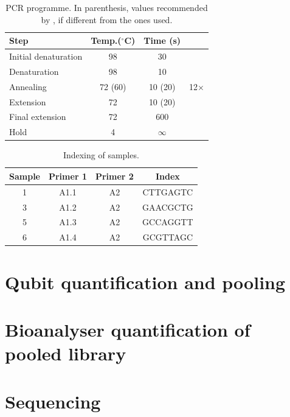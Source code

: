 \documentclass[a4paper,12pt]{article}
\begin{document}
\begin{table}
 \begin{center}
  \caption{PCR programme. In parenthesis, values recommended by \citet{Meyer2010}, if different from the ones used.}\label{tau:pcrprogramme}
  \vspace*{0.3cm}
  \begin{tabular}{lccl}
   \toprule
Step&Temp.($^\circ$C)&Time (s)&\\
   \midrule
Initial denaturation&98&30&\\
Denaturation&98&\multicolumn{1}{c|}{10}&\\
Annealing&72 (60)&\multicolumn{1}{c|}{10 (20)}&12$\times$\\
Extension&72&\multicolumn{1}{c|}{10 (20)}&\\
Final extension&72&600&\\
Hold&4&$\infty$&\\
   \bottomrule
  \end{tabular}
 \end{center}
\end{table}

\begin{table}
 \begin{center}
  \caption{Indexing of samples.}\label{tau:index}
  \begin{tabular}{cccc}
   \toprule
Sample&Primer 1&Primer 2&Index\\
   \midrule
1&A1.1&A2&CTTGAGTC\\
3&A1.2&A2&GAACGCTG\\
5&A1.3&A2&GCCAGGTT\\
6&A1.4&A2&GCGTTAGC\\
   \bottomrule
  \end{tabular}
 \end{center}
\end{table}

\section{Qubit quantification and pooling}

\section{Bioanalyser quantification of pooled library}

\section{Sequencing}



\end{document}
